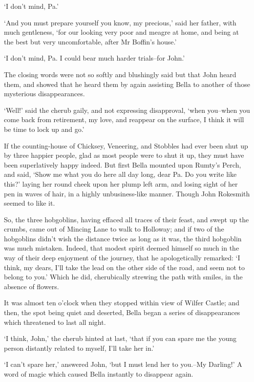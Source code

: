 ‘I don’t mind, Pa.’

‘And you must prepare yourself you know, my precious,’ said her father,
with much gentleness, ‘for our looking very poor and meagre at home, and
being at the best but very uncomfortable, after Mr Boffin’s house.’

‘I don’t mind, Pa. I could bear much harder trials--for John.’

The closing words were not so softly and blushingly said but that John
heard them, and showed that he heard them by again assisting Bella to
another of those mysterious disappearances.

‘Well!’ said the cherub gaily, and not expressing disapproval, ‘when
you--when you come back from retirement, my love, and reappear on the
surface, I think it will be time to lock up and go.’

If the counting-house of Chicksey, Veneering, and Stobbles had ever been
shut up by three happier people, glad as most people were to shut it up,
they must have been superlatively happy indeed. But first Bella mounted
upon Rumty’s Perch, and said, ‘Show me what you do here all day long,
dear Pa. Do you write like this?’ laying her round cheek upon her plump
left arm, and losing sight of her pen in waves of hair, in a highly
unbusiness-like manner. Though John Rokesmith seemed to like it.

So, the three hobgoblins, having effaced all traces of their feast, and
swept up the crumbs, came out of Mincing Lane to walk to Holloway; and
if two of the hobgoblins didn’t wish the distance twice as long as it
was, the third hobgoblin was much mistaken. Indeed, that modest spirit
deemed himself so much in the way of their deep enjoyment of the
journey, that he apologetically remarked: ‘I think, my dears, I’ll take
the lead on the other side of the road, and seem not to belong to you.’
Which he did, cherubically strewing the path with smiles, in the absence
of flowers.

It was almost ten o’clock when they stopped within view of Wilfer
Castle; and then, the spot being quiet and deserted, Bella began a
series of disappearances which threatened to last all night.

‘I think, John,’ the cherub hinted at last, ‘that if you can spare me
the young person distantly related to myself, I’ll take her in.’

‘I can’t spare her,’ answered John, ‘but I must lend her to you.--My
Darling!’ A word of magic which caused Bella instantly to disappear
again.

